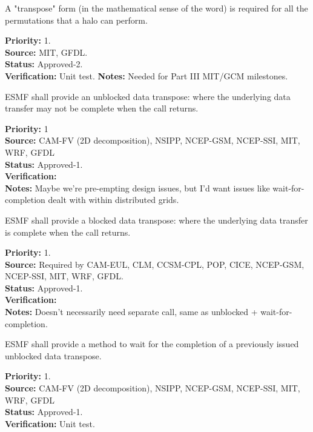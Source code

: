 A "transpose" form (in the mathematical sense of the word) is required
for all the permutations that a halo can perform.
\begin{reqlist}
{\bf Priority:} 1. \\ 
{\bf Source:}  MIT, GFDL. \\
{\bf Status:} Approved-2. \\
{\bf Verification:} Unit test.
{\bf Notes:} Needed for Part III MIT/GCM milestones.
\end{reqlist}

 \label{DG:transpose}


ESMF shall provide an unblocked data transpose: where the underlying
data transfer may not be complete when the call returns.

\begin{reqlist}
{\bf Priority:} 1 \\ 
{\bf Source:} CAM-FV (2D decomposition), NSIPP, NCEP-GSM, NCEP-SSI, MIT, WRF, GFDL \\
{\bf Status:} Approved-1. \\
{\bf Verification:} \\
{\bf Notes:} Maybe we're pre-empting design issues, but I'd want
  issues like wait-for-completion dealt with within distributed grids.
\end{reqlist}


ESMF shall provide a blocked data transpose: where the underlying
data transfer is complete when the call returns.

\begin{reqlist}
{\bf Priority:} 1. \\
{\bf Source:} Required by CAM-EUL, CLM, CCSM-CPL, POP, CICE, NCEP-GSM, NCEP-SSI, MIT, WRF, GFDL. \\
{\bf Status:} Approved-1. \\
{\bf Verification:} \\
{\bf Notes:} Doesn't necessarily need separate call, same as unblocked
  + wait-for-completion.
\end{reqlist}


ESMF shall provide a method to wait for the completion of a previously
issued unblocked data transpose.

\begin{reqlist}
{\bf Priority:} 1. \\ 
{\bf Source:} CAM-FV (2D decomposition), NSIPP, NCEP-GSM, NCEP-SSI, MIT, WRF, GFDL \\
{\bf Status:} Approved-1. \\
{\bf Verification:} Unit test.
\end{reqlist}


